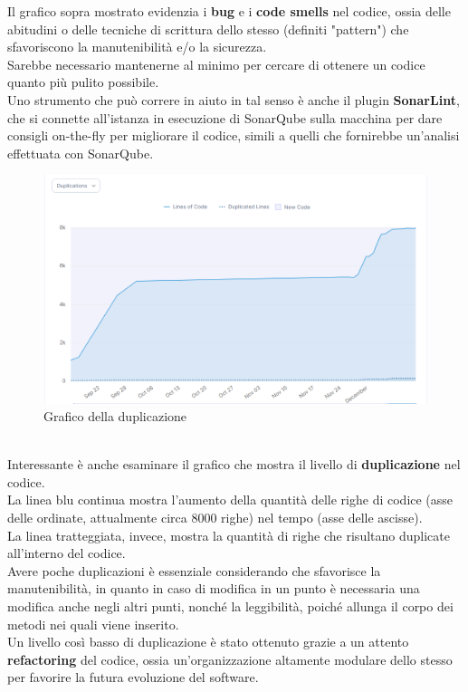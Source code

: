         Il grafico sopra mostrato evidenzia i \textbf{bug} e i \textbf{code smells} nel codice, ossia delle abitudini o delle tecniche di scrittura dello stesso (definiti "pattern") che sfavoriscono la manutenibilità e/o la sicurezza. \\
        Sarebbe necessario mantenerne al minimo per cercare di ottenere un codice quanto più pulito possibile. \\
        Uno strumento che può correre in aiuto in tal senso è anche il plugin \textbf{SonarLint}, che si connette all'istanza in esecuzione di SonarQube sulla macchina per dare consigli on-the-fly per migliorare il codice, simili a quelli che fornirebbe un'analisi effettuata con SonarQube. \\
        \begin{figure}[htbp!]
            \centering
            \includegraphics[width=0.7\linewidth]{Immagini/Verifica Software/Duplications.png}
            \caption{Grafico della duplicazione}
        \end{figure} \\
        Interessante è anche esaminare il grafico che mostra il livello di \textbf{duplicazione} nel codice. \\
        La linea blu continua mostra l'aumento della quantità delle righe di codice (asse delle ordinate, attualmente circa 8000 righe) nel tempo (asse delle ascisse). \\
        La linea tratteggiata, invece, mostra la quantità di righe che risultano duplicate all'interno del codice. \\
        Avere poche duplicazioni è essenziale considerando che sfavorisce la manutenibilità, in quanto in caso di modifica in un punto è necessaria una modifica anche negli altri punti, nonché la leggibilità, poiché allunga il corpo dei metodi nei quali viene inserito. \\
        Un livello così basso di duplicazione è stato ottenuto grazie a un attento \textbf{refactoring} del codice, ossia un'organizzazione altamente modulare dello stesso per favorire la futura evoluzione del software. \\
